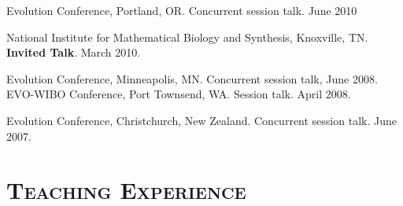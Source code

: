 \documentclass[centered,overlapped,line]{res}
\begin{document}
\begin{resume}
  Evolution Conference, Portland, OR. Concurrent session talk. June 2010

  National Institute for Mathematical Biology and Synthesis, Knoxville, TN. \textbf{Invited Talk}. March 2010.


  Evolution Conference, Minneapolis, MN. Concurrent session talk, June 2008. \\
  EVO-WIBO Conference, Port Townsend, WA. Session talk. April 2008. 

  Evolution Conference, Christchurch, New Zealand. Concurrent session talk. June 2007. 



  \section{\bf \large \scshape  Teaching Experience}


\end{resume}
\end{document}
